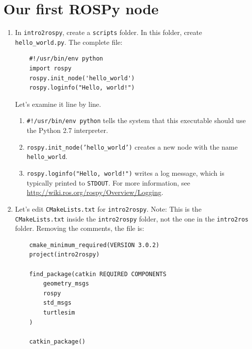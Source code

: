 \documentclass{article}
\begin{document}
    \section{Our first ROSPy node}
    \begin{enumerate}
        \item In \texttt{intro2rospy}, create a \texttt{scripts} folder. In this folder,
        create \texttt{hello\_world.py}. The complete file:
        \begin{verbatim}
    #!/usr/bin/env python
    import rospy
    rospy.init_node('hello_world')
    rospy.loginfo("Hello, world!")
        \end{verbatim}
        Let's examine it line by line.
        \begin{enumerate}
            \item \texttt{#!/usr/bin/env python} tells the system that this
            executable should use the Python 2.7 interpreter.
            \item \texttt{rospy.init_node('hello_world')} creates a new node
            with the name \texttt{hello\_world}.
            \item \texttt{rospy.loginfo("Hello, world!")} writes a log message,
             which is 
            typically printed to \texttt{STDOUT}. For more information, see 
            \url{http://wiki.ros.org/rospy/Overview/Logging}.
        \end{enumerate}
        \item Let's edit \texttt{CMakeLists.txt} for \texttt{intro2rospy}.
         Note: This is the \texttt{CMakeLists.txt}
        inside the \texttt{intro2rospy} folder, not the one in the 
        \texttt{intro2ros} folder. Removing the comments, the file is:
        \begin{verbatim}
    cmake_minimum_required(VERSION 3.0.2)
    project(intro2rospy)
    
    find_package(catkin REQUIRED COMPONENTS
        geometry_msgs
        rospy
        std_msgs
        turtlesim
    )
    
    catkin_package()
    

\end{verbatim}
\end{enumerate}
\end{document}
